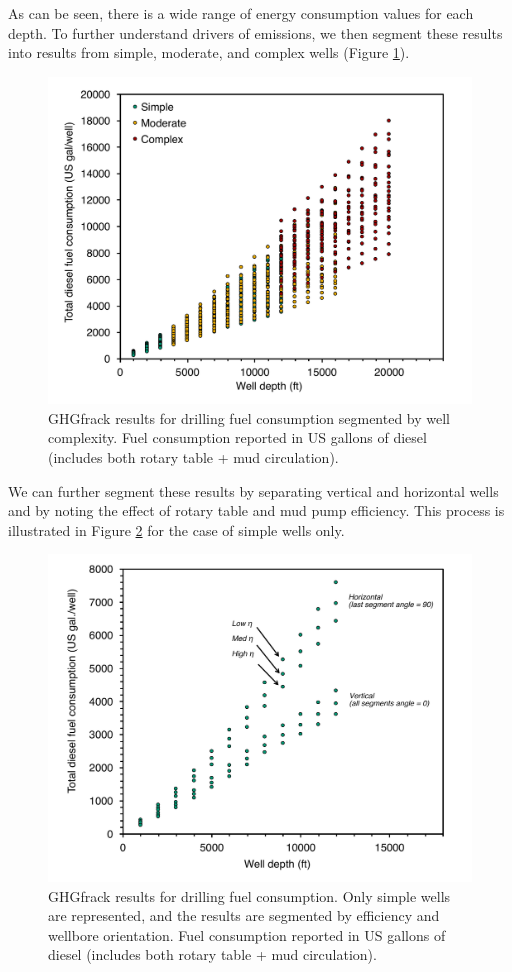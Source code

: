 \documentclass[11pt]{report}
\begin{document}
As can be seen, there is a wide range of energy consumption values for each depth.  To further understand drivers of emissions, we then segment these results into results from simple, moderate, and complex wells (Figure \ref{fig:drilling2}).

\begin{figure}[tb]
\includegraphics[width=0.8\columnwidth]{images/Drilling2.pdf}
\caption{GHGfrack results for drilling fuel consumption segmented by well complexity. Fuel consumption reported in US gallons of diesel (includes both rotary table + mud circulation).}
\label{fig:drilling2}
\end{figure}

We can further segment these results by separating vertical and horizontal wells and by noting the effect of rotary table and mud pump efficiency. This process is illustrated in Figure \ref{fig:drilling3} for the case of simple wells only.

\begin{figure}[tb]
\includegraphics[width=0.8\columnwidth]{images/Drilling3.pdf}
\caption{GHGfrack results for drilling fuel consumption. Only simple wells are represented, and the results are segmented by efficiency and wellbore orientation. Fuel consumption reported in US gallons of diesel (includes both rotary table + mud circulation).}
\label{fig:drilling3}
\end{figure}
\end{document}

